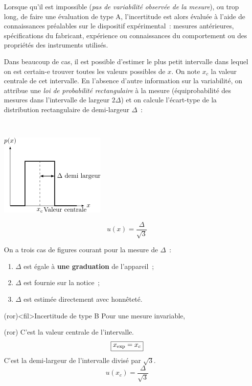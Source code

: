 \documentclass[../main/main.tex]{subfiles}
\begin{document}
Lorsque qu'il est impossible (\textit{pas de variabilité observée de la
	mesure}), ou trop long, de faire une évaluation de type A, l'incertitude est
alors évaluée à l'aide de connaissances préalables sur le dispositif
expérimental~: mesures antérieures, spécifications du fabricant, expérience ou
connaissances du comportement ou des propriétés des instruments utilisés.
\bigbreak
\noindent
\begin{minipage}[t]{.50\linewidth}
	Dans beaucoup de cas, il est possible d'estimer le plus petit intervalle dans
	lequel on est certain-e trouver toutes les valeurs possibles de $x$. On note
	$x_c$ la valeur centrale de cet intervalle.
	\smallbreak
	En l'absence d'autre information sur la variabilité, on attribue une
	\textit{loi de probabilité rectangulaire} à la mesure (équiprobabilité des
	mesures dans l'intervalle de largeur $2\Delta$) et on calcule l'écart-type de
	la distribution rectangulaire de demi-largeur $\Delta$~:
\end{minipage}
\hfill
\begin{minipage}[t]{.45\linewidth}
	~
	\vspace*{-10pt}
	\begin{center}
		\includegraphics[scale=1]{typeB}
		\label{fig:typeB}
	\end{center}
\end{minipage}
\[
	\boxed{u(x) = \frac{\Delta}{\sqrt{3}}}
\]

On a trois cas de figures courant pour la mesure de $\Delta$~:
\begin{enumerate}
	\item $\Delta$ est égale à \textbf{une graduation} de l'appareil~;
	\item $\Delta$ est fournie sur la notice~;
	\item $\Delta$ est estimée directement avec honnêteté.
\end{enumerate}

\begin{tcb}(ror)<fil>{Incertitude de type B}
	Pour une mesure invariable,
	\smallbreak
	\begin{isd}[cnt](ror)
		C'est la valeur centrale de l'intervalle.
		\[
			\boxed{x_{\rm exp} = x_c}
		\]
		\tcblower
		C'est la demi-largeur de l'intervalle divisé par $\sqrt{3}$.
		\[
			\boxed{u(x_c) = \frac{\Delta}{\sqrt{3}}}
		\]
	\end{isd}
\end{tcb}
\end{document}
